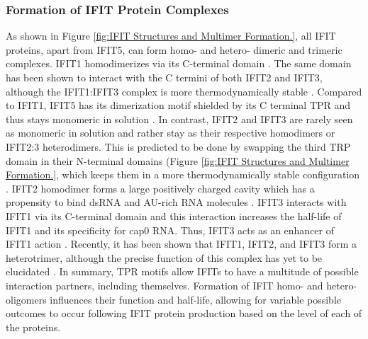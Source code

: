 \subsubsection{Formation of IFIT Protein Complexes} \label{Formation of IFIT Protein Complexes}
As shown in Figure \ref{fig:IFIT Structures and Multimer Formation.}, all IFIT proteins, apart from IFIT5, can form homo- and hetero- dimeric and trimeric complexes. IFIT1 homodimerizes via its C-terminal domain \cite{Abbas2013StructuralProteins}. The same domain has been shown to interact with the C termini of both IFIT2 and IFIT3, although the IFIT1:IFIT3 complex is more thermodynamically stable \cite{Fleith2018IFIT3RNA}. Compared to IFIT1, IFIT5 has its dimerization motif shielded by its C terminal TPR and thus stays monomeric in solution \cite{Kumar2014InhibitionMRNAs}. In contrast, IFIT2 and IFIT3 are rarely seen as monomeric in solution and rather stay as their respective homodimers or IFIT2:3 heterodimers. This is predicted to be done by swapping the third TRP domain in their N-terminal domains (Figure \ref{fig:IFIT Structures and Multimer Formation.}, which keeps them in a more thermodynamically stable configuration \cite{Yang2012CrystalMechanisms}. IFIT2 homodimer forms a large positively charged cavity which has a propensity to bind dsRNA and AU-rich RNA molecules \cite{Vladimer2014IFITs:Proteins, Yang2012CrystalMechanisms}. IFIT3 interacts with IFIT1 via its C-terminal domain and this interaction increases the half-life of IFIT1 and its specificity for cap0 RNA. Thus, IFIT3 acts as an enhancer of IFIT1 action \cite{Fleith2018IFIT3RNA, Johnson2018HumanStability}. Recently, it has been shown that IFIT1, IFIT2, and IFIT3 form a heterotrimer, although the precise function of this complex has yet to be elucidated \cite{Fleith2018IFIT3RNA}. In summary, TPR motifs allow IFITs to have a multitude of possible interaction partners, including themselves. Formation of IFIT homo- and hetero-oligomers influences their function and half-life, allowing for variable possible outcomes to occur following IFIT protein production based on the level of each of the proteins. 


